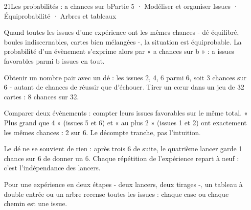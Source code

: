 \begin{ouverture}[probabilites]{21}{Les probabilités : a chances sur b}{Partie 5 · Modéliser et organiser}
{Issues · Équiprobabilité · Arbres et tableaux}
\end{ouverture}
\pagestyle{otMain}\essentiel\fontsize{11}{15}\selectfont
{}\label{cours-21-1}
\begin{definition}Quand toutes les issues d’une expérience ont les mêmes chances - dé équilibré, boules indiscernables, cartes bien mélangées -, la situation est équiprobable. La probabilité d’un évènement s’exprime alors par « a chances sur b » : a issues favorables parmi b issues en tout.\end{definition}
\begin{exemple}Obtenir un nombre pair avec un dé : les issues 2, 4, 6 parmi 6, soit 3 chances sur 6 - autant de chances de réussir que d’échouer. Tirer un cœur dans un jeu de 32 cartes : 8 chances sur 32.\end{exemple}
\begin{savoirfaire}Comparer deux évènements : compter leurs issues favorables sur le même total. « Plus grand que 4 » (issues 5 et 6) et « au plus 2 » (issues 1 et 2) ont exactement les mêmes chances : 2 sur 6. Le décompte tranche, pas l’intuition.\end{savoirfaire}
\begin{attention}Le dé ne se souvient de rien : après trois 6 de suite, le quatrième lancer garde 1 chance sur 6 de donner un 6. Chaque répétition de l’expérience repart à neuf : c’est l’indépendance des lancers.\end{attention}
\clearpage
{}\label{cours-21-2}
\begin{definition}Pour une expérience en deux étapes - deux lancers, deux tirages -, un tableau à double entrée ou un arbre recense toutes les issues : chaque case ou chaque chemin est une issue.\end{definition}
\label{fig-cours-21-2-cours-arbre}

